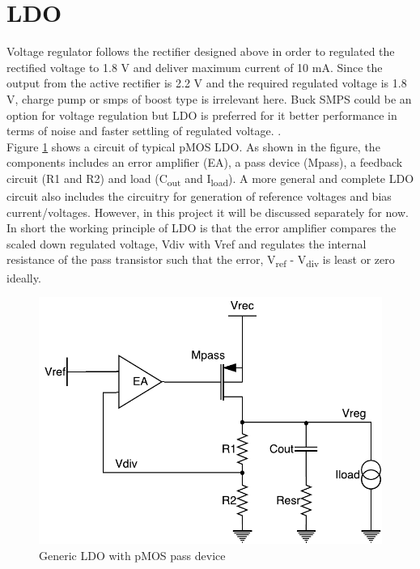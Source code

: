 \documentclass[12pt,a4paper,UKenglish]{article}
\begin{document}
\clearpage
\newpage

\section{LDO}

Voltage regulator follows the rectifier designed above in order to regulated the rectified voltage to 1.8 V and deliver maximum current of 10 mA. Since the output from the active rectifier is 2.2 V and the required regulated voltage is 1.8 V, charge pump or  \acrshort{smps} of boost type is irrelevant here. Buck SMPS could be an option for voltage regulation but LDO is preferred for it better performance in terms of noise and faster settling of regulated voltage.  \cite{ldo_psu}.\\ 

Figure \ref{ldo_gen} shows a circuit of typical pMOS LDO. As shown in the figure, the components includes an error amplifier (EA), a pass device (Mpass), a feedback circuit (R1 and R2) and load (C\textsubscript{out} and I\textsubscript{load}). A more general and complete LDO circuit also includes the circuitry for generation of reference voltages and bias current/voltages. However, in this project it will be discussed separately for now. In short the working principle of LDO is that the error amplifier compares the scaled down regulated voltage, Vdiv with Vref and regulates the internal resistance of the pass transistor such that  the error, V\textsubscript{ref} - V\textsubscript{div} is least or zero ideally. 

\begin{figure}[htbp] %
   \centering
   \includegraphics[width=.9\textwidth]{img/ldo.pdf} 
   \caption{Generic LDO with pMOS pass device}
   \label{ldo_gen}
\end{figure}
\end{document}
